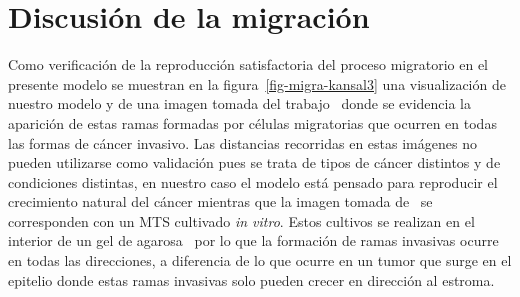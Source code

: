 \section{Discusi\'on de la migraci\'on}
\label{sec-migra-validation}
Como verificaci\'on de la reproducci\'on satisfactoria del proceso migratorio en el presente modelo se muestran en la figura~\ref{fig-migra-kansal3} una visualizaci\'on de nuestro modelo y de una imagen tomada del trabajo~\cite{kansal3} donde se evidencia la aparici\'on de estas ramas formadas por c\'elulas migratorias que ocurren en todas las formas de c\'ancer invasivo. Las distancias recorridas en estas im\'agenes no pueden utilizarse como validaci\'on pues se trata de tipos de c\'ancer distintos y de condiciones distintas, en nuestro caso el modelo est\'a pensado para reproducir el crecimiento natural del c\'ancer mientras que la imagen tomada de~\cite{kansal3} se corresponden con un MTS cultivado \emph{in vitro}. Estos cultivos se realizan en el interior de un gel de agarosa~\cite{helmlinger} por lo que la formaci\'on de ramas invasivas ocurre en todas las direcciones, a diferencia de lo que ocurre en un tumor que surge en el epitelio donde estas ramas invasivas solo pueden crecer en direcci\'on al estroma.
